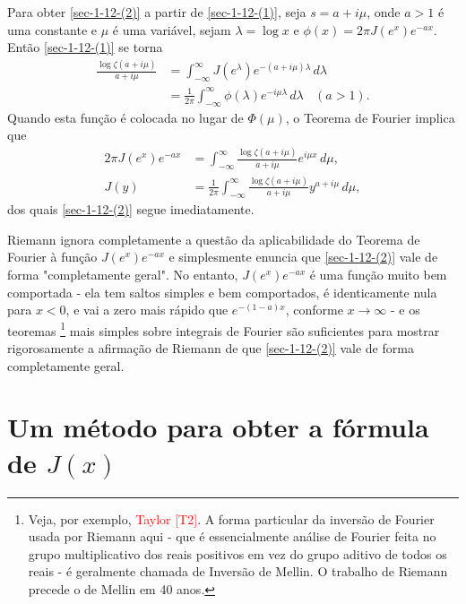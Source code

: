     Para obter \eqref{sec-1-12-(2)} a partir de \eqref{sec-1-12-(1)}, seja $s = a + i\mu$, onde $a>1$ é uma constante e $\mu$ é uma variável, sejam $\lambda = \log x$ e $\phi(x) = 2 \pi J(e^x) e^{-ax}$. Então \eqref{sec-1-12-(1)} se torna
    \begin{align*}
        \frac{\log \zeta(a + i\mu)}{a + i\mu} &= \int_{-\infty}^{\infty} J(e^{\lambda}) e^{-(a + i\mu)\lambda} \, d\lambda \\
        &= \frac{1}{2\pi} \int_{-\infty}^{\infty} \phi(\lambda) e^{-i\mu\lambda} \, d\lambda \ \ \ \ (a > 1).
    \end{align*}
    Quando esta função é colocada no lugar de $\Phi(\mu)$, o Teorema de Fourier implica que
    \begin{align*}
        2\pi J(e^x) e^{-ax} &= \int_{-\infty}^{\infty} \frac{\log \zeta(a + i\mu)}{a + i\mu} e^{i \mu x} \, d\mu, \\
        J(y) &= \frac{1}{2\pi} \int_{-\infty}^{\infty} \frac{\log \zeta(a + i\mu)}{a + i\mu} y^{a + i\mu} \, d\mu,
    \end{align*}
    dos quais \eqref{sec-1-12-(2)} segue imediatamente.
    
    Riemann ignora completamente a questão da aplicabilidade do Teorema de Fourier à função $J(e^x)e^{-ax}$ e simplesmente enuncia que \eqref{sec-1-12-(2)} vale de forma "completamente geral". No entanto, $J(e^x)e^{-ax}$ é uma função muito bem comportada - ela tem saltos simples e bem comportados, é identicamente nula para $x < 0$, e vai a zero mais rápido que $e^{-(1-a)x}$, conforme $x \to \infty$ - e os teoremas
    \footnote{Veja, por exemplo, \textcolor{red}{Taylor [T2]}. A forma particular da inversão de Fourier usada por Riemann aqui - que é essencialmente análise de Fourier feita no grupo multiplicativo dos reais positivos em vez do grupo aditivo de todos os reais - é geralmente chamada de Inversão de Mellin. O trabalho de Riemann precede o de Mellin em 40 anos.} 
    mais simples sobre integrais de Fourier são suficientes para mostrar rigorosamente a afirmação de Riemann de que \eqref{sec-1-12-(2)} vale de forma completamente geral.
    
    
    \section{Um método para obter a fórmula de $J(x)$}
    
